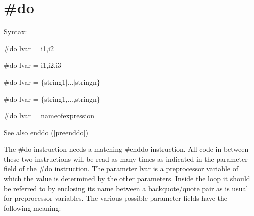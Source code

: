  
\section{\#do}
\label{predo}

\noindent Syntax:

\#do lvar = i1,i2

\#do lvar = i1,i2,i3

\#do lvar = $\{$string1$|$...$|$stringn$\}$

\#do lvar = $\{$string1,...,stringn$\}$

\#do lvar = nameofexpression
 
\noindent See also enddo (\ref{preenddo})

\noindent The \#do instruction needs a matching 
\#enddo instruction. All code in-between these two 
instructions will be read as many times as indicated in the parameter field 
of the \#do instruction. The parameter lvar is a preprocessor variable of 
which the value is determined by the other parameters. Inside the loop it 
should be referred to by enclosing its name between a backquote/quote pair 
as is usual for preprocessor variables. The various possible parameter 
fields have the following meaning:
